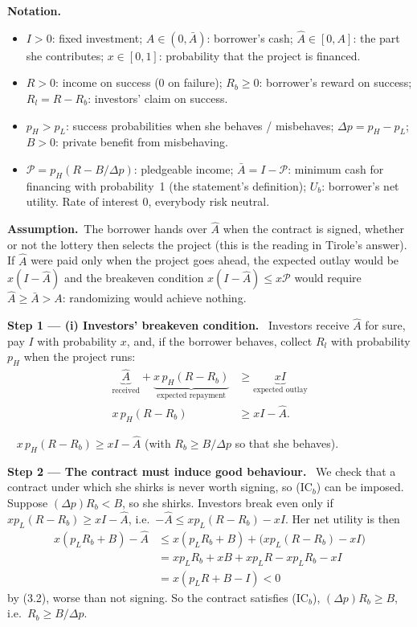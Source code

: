 \documentclass[11pt,a4paper]{article}
\newcommand{\notation}{\par\noindent\textbf{Notation.}}
\newcommand{\step}[2]{\par\medskip\noindent\textbf{Step #1 --- #2.}~}
\newcommand{\assume}{\par\smallskip\noindent\textbf{Assumption.}~}
\newcommand{\answer}[1]{\par\smallskip\noindent\fbox{\textbf{Answer #1.}}~}
\begin{document}
\notation
\begin{itemize}
  \item $I>0$: fixed investment; $A\in(0,\bar A)$: borrower's cash; $\hat A\in[0,A]$: the part she contributes; $x\in[0,1]$: probability that the project is financed.
  \item $R>0$: income on success (0 on failure); $R_b\ge 0$: borrower's reward on success; $R_l=R-R_b$: investors' claim on success.
  \item $p_H>p_L$: success probabilities when she behaves / misbehaves; $\Delta p=p_H-p_L$; $B>0$: private benefit from misbehaving.
  \item $\mathcal P=p_H(R-B/\Delta p)$: pledgeable income; $\bar A=I-\mathcal P$: minimum cash for financing with probability~1 (the statement's definition); $U_b$: borrower's net utility. Rate of interest 0, everybody risk neutral.
\end{itemize}

\assume The borrower hands over $\hat A$ when the contract is signed, whether or not the
lottery then selects the project (this is the reading in Tirole's answer). If $\hat A$ were
paid only when the project goes ahead, the expected outlay would be $x(I-\hat A)$ and the
breakeven condition $x(I-\hat A)\le x\mathcal P$ would require $\hat A\ge\bar A>A$: randomizing
would achieve nothing.

\step{1}{(i) Investors' breakeven condition} Investors receive $\hat A$ for sure, pay $I$ with
probability $x$, and, if the borrower behaves, collect $R_l$ with probability $p_H$ when the
project runs:
\begin{align}
  \underbrace{\hat A}_{\text{received}}+\underbrace{x\,p_H(R-R_b)}_{\text{expected repayment}}
     &\ge \underbrace{x I}_{\text{expected outlay}} \nonumber\\
  x\,p_H(R-R_b) &\ge x I-\hat A. \label{t4e5-IR}
\end{align}

\answer{(i)} $x\,p_H(R-R_b)\ge xI-\hat A$ (with $R_b\ge B/\Delta p$ so that she behaves).

\step{2}{The contract must induce good behaviour} We check that a contract under which she shirks
is never worth signing, so (IC$_b$) can be imposed. Suppose $(\Delta p)R_b<B$, so she shirks.
Investors break even only if $x p_L(R-R_b)\ge xI-\hat A$, i.e.\ $-\hat A\le x p_L(R-R_b)-xI$.
Her net utility is then
\begin{align}
  x(p_L R_b+B)-\hat A &\le x(p_L R_b+B)+\big(x p_L(R-R_b)-xI\big) \nonumber\\
                      &= x p_L R_b+xB+x p_L R-x p_L R_b-xI \nonumber\\
                      &= x(p_L R+B-I) < 0 \label{t4e5-shirk}
\end{align}
by (3.2), worse than not signing. So the contract satisfies (IC$_b$), $(\Delta p)R_b\ge B$, i.e.\
$R_b\ge B/\Delta p$.
\end{document}

